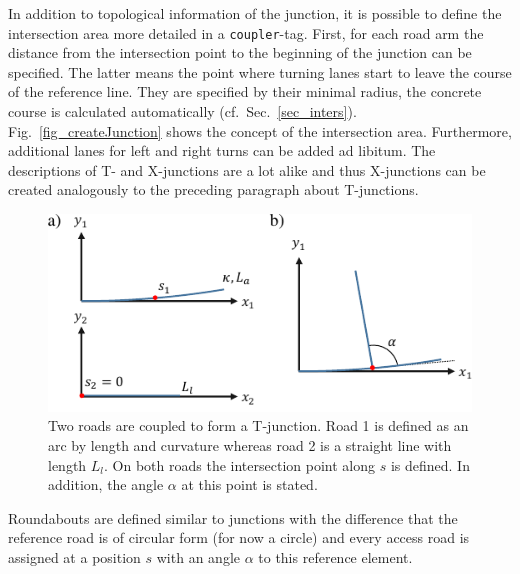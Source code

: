 \documentclass[a4paper, 10pt, conference]{ieeeconf}      %
\begin{document}
In addition to topological information of the junction, it is possible to define the intersection area more detailed in a \texttt{coupler}-tag. First, for each road arm the distance from the intersection point to the beginning of the junction can be specified. The latter means the point where turning lanes start to leave the course of the reference line. They are specified by their minimal radius, the concrete course is calculated automatically (cf.~Sec.~\ref{sec_inters}). Fig.~\ref{fig_createJunction} shows the concept of the intersection area. Furthermore, additional lanes for left and right turns can be added ad libitum. The descriptions of T- and X-junctions are a lot alike and thus X-junctions can be created analogously to the preceding paragraph about T-junctions.
\begin{figure}[thpb] 		
	\centering
	\includegraphics{fig/junctionDef.pdf}	
	\caption{Two roads are coupled to form a T-junction. Road 1 is defined as an arc by length and curvature whereas road 2 is a straight line with length $L_l$. On both roads the intersection point along $s$ is defined. In addition, the angle $\alpha$ at this point is stated. }
	\label{fig_juncDef}
\end{figure}

Roundabouts are defined similar to junctions with the difference that the reference road is of circular form (for now a circle) and every access road is assigned at a position $s$ with an angle $\alpha$ to this reference element.
\end{document}
